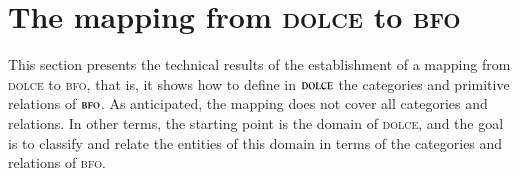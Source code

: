 \documentclass[ao]{iosart2x}
\newcommand{\nb}[1]{\textcolor{red}{$|$}\marginpar{\hspace*{-0cm}\parbox{20mm}{\scriptsize\raggedright\textcolor{red}{#1}}}}
\newcommand{\bflist}{\begin{list}{}{\setlength{\topsep}{2mm}\setlength{\parsep}{0mm}\setlength{\leftmargin}{9.2mm}\setlength{\labelwidth}{8mm}}}
\newcommand{\bfoAxLabel}{\textrm{a$_\texttt{b}$}}
\newcommand{\bfoThrLabel}{\textrm{t$_\texttt{b}$}}
\newcommand{\dbAxLabel}{\textrm{a}$_\texttt{db}$}
\newcommand{\refbfoax}[1]{({\bfoAxLabel}\ref{#1})}
\newcommand{\refbfoth}[1]{({\bfoThrLabel}\ref{#1})}
\newcommand{\refdbax}[1]{({\dbAxLabel}\ref{#1})}
\newcommand{\dolce}{{\textsc{dolce}}}
\newcommand{\bfo}{{\textsc{bfo}}}
\newcommand {\thbfo} {\ensuremath{\mathfrak{B}}}
\newcommand{\bfoiof}[1]{{\,::_{#1\:\!}}}
\begin{document}
%


%
%
%
%





\section{The mapping from {\dolce} to {\bfo}}\label{sect_d2b}


This section presents the technical results of the establishment of a mapping from {\dolce} to {\bfo}, that is, it shows how to define in {$\dolce$} the categories and primitive relations of {$\bfo$}. As anticipated, the mapping does not cover all categories and relations. 
In other terms, the starting point is the domain of {\dolce}, and the goal is to classify and relate the entities of this domain in terms of the categories and relations of {\bfo}.%
\end{document}
